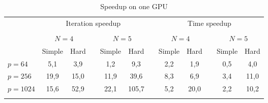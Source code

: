 \documentclass{svproc}
\begin{document}
\begin{table}[t]
                \caption{Speedup on one GPU}
                \label{table:average_AS_GPU}
                \center
                \begin{tabular}{lccccccccccc}
																& \multicolumn{5}{c}{ Iteration speedup} & & \multicolumn{5}{c}{ Time speedup}\\
                               \noalign{\smallskip} \cline{2-6} \cline{8-12}  \\
                               & \multicolumn{2}{c}{ $N=4$ } & & \multicolumn{2}{c}{$N=5$} &  & \multicolumn{2}{c}{ $N=4$ } & & \multicolumn{2}{c}{$N=5$} \\
                               \noalign{\smallskip} \cline{2-3} \cline{5-6}  \cline{8-9} \cline{11-12} \noalign{\smallskip}
                               & Simple & Hard & & Simple & Hard &  & Simple & Hard & & Simple & Hard  \\
                               \noalign{\smallskip} \hline \noalign{\smallskip}                               
                               $p=64$  &    5,1  & 3,9  &   & 1,2 	 & 9,3   &   & 2,2	& 1,9	     &   & 0,5	& 4,0  \\
                               $p=256$ &    19,9 & 15,0 &   & 11,9 	 & 39,6  &   & 8,3	& 6,9	     &   & 3,4	& 11,0 \\
							   $p=1024$&    15,6 & 52,9 &   & 22,1	 & 105,7 &   & 5,2	& 20,0      &   & 2,2	& 10,2 \\
                               \noalign{\smallskip}\hline
                \end{tabular}
\end{table}
\end{document}
